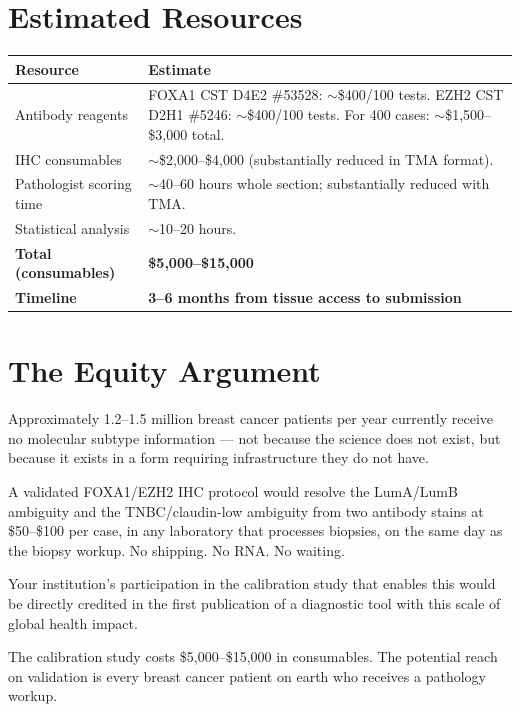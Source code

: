 \documentclass[11pt, a4paper]{article}
\begin{document}
\section{Estimated Resources}

\begin{center}
\begin{tabular}{p{5cm}p{8cm}}
\toprule
\textbf{Resource} & \textbf{Estimate} \\
\midrule
Antibody reagents &
FOXA1 CST D4E2 \#53528:
${\sim}$\$400/100 tests.
EZH2 CST D2H1 \#5246:
${\sim}$\$400/100 tests.
For 400 cases:
${\sim}$\$1,500--\$3,000 total. \\[0.3em]
IHC consumables &
${\sim}$\$2,000--\$4,000
(substantially reduced in TMA
format). \\[0.3em]
Pathologist scoring time &
${\sim}$40--60 hours whole section;
substantially reduced with TMA. \\[0.3em]
Statistical analysis &
${\sim}$10--20 hours. \\[0.3em]
\textbf{Total (consumables)} &
\textbf{\$5,000--\$15,000} \\[0.3em]
\textbf{Timeline} &
\textbf{3--6 months from tissue
access to submission} \\
\bottomrule
\end{tabular}
\end{center}

\section{The Equity Argument}

\begin{mdframed}[backgroundcolor=equitybox,
                 linecolor=orange!60!black,
                 linewidth=1pt]
Approximately 1.2--1.5 million breast cancer
patients per year currently receive no
molecular subtype information --- not because
the science does not exist, but because it
exists in a form requiring infrastructure
they do not have.

A validated FOXA1/EZH2 IHC protocol would
resolve the LumA/LumB ambiguity and the
TNBC/claudin-low ambiguity from two antibody
stains at \$50--\$100 per case, in any
laboratory that processes biopsies, on the
same day as the biopsy workup. No shipping.
No RNA. No waiting.

Your institution's participation in the
calibration study that enables this would
be directly credited in the first publication
of a diagnostic tool with this scale of
global health impact.

The calibration study costs \$5,000--\$15,000
in consumables. The potential reach on
validation is every breast cancer patient on
earth who receives a pathology workup.
\end{mdframed}
\end{document}
